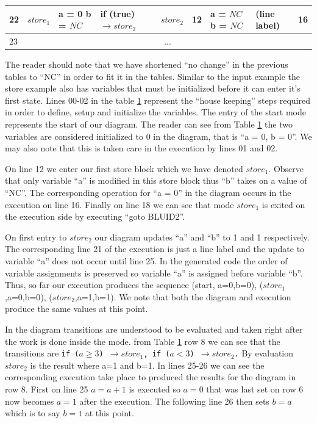 \begin{table}[htcb]
\begin{tabular}{|p{} | p{} | p{} | p{} | p{} | p{} | p{} | p{} | p{} |}
			\hline
			22&$store_1$			&	a = 0 \newline b = $NC$		&	if (true) $\rightarrow store_2$ & $store_2$			&	12					&	a = $NC$ \newline b = $NC$	&	(line label)				&	16	\\
			\hline
			23&\multicolumn{8}{|c|}{...}\\
			\hline
		\end{tabular}
	\label{table:StoreExecCombined}
\end{table}

The reader should note that we have shortened ``no change'' in the previous tables to ``NC'' in order to fit
it in the tables.  Similar to the input example the store example also has variables that must be initialized 
before it can enter it's first state. Lines 00-02 in the table \ref{table:StoreExecCombined} represent the 
``house keeping'' steps required in order to define, setup and initialize the variables. The entry of the start
mode represents the start of our diagram. The reader can see from Table \ref{table:StoreExecCombined} the two
variables are considered initialized to 0 in the diagram, that is ``a = 0, b = 0''. We may also note that this
is taken care in the execution by lines 01 and 02.

On line 12 we enter our first store block which we
have denoted $store_1$. Observe that only variable ``a'' is modified in this store block thus ``b'' takes on 
a value of ``NC''. The corresponding operation for ``a = 0'' in the diagram occurs in the execution on line 16.
Finally on line 18 we can see that mode $store_1$ is exited on the execution side by executing ``goto BLUID2''.

On first entry to $store_2$ our diagram updates ``a'' and ``b'' to 1 and 1 respectively. The corresponding line 21 of
the execution is just a line label and the update to variable ``a'' does not occur until line 25. In the generated
code the order of variable assignments is preserved so variable ``a'' is assigned before variable ``b''. Thus, so
far our execution produces the sequence (start, {a=0,b=0}), ($store_1$,{a=0,b=0}), ($store_2$,{a=1,b=1}). We note that
both the diagram and execution produce the same values at this point.

In the diagram transitions are understood to be evaluated and taken right after the work is done inside the mode.
from Table \ref{table:StoreExecCombined} row 8 we can see that the transitions are 
\texttt{if ($a \geq 3$) $\rightarrow store_1$, if ($a < 3$) $\rightarrow store_2$.} 
By evaluation \texttt{$store_2$} is the result where a=1 and b=1. 
In lines 25-26 we can see the corresponding execution take place to
produced the results for the diagram in row 8. 
First on line 25 $a = a + 1$ is executed so $a = 0$ that was last set
on row 6 now becomes $a = 1$ after the execution. 
The following line 26 then sets $b = a$ which is to say $b = 1$ at
this point.

